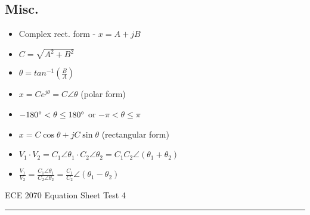 \documentclass [12pt] {article}
\begin{document}
\begin{multicols*}{2}
\section{Misc.}
	\begin{itemize}
		\item Complex rect. form - $x = A + jB$ 
		\item $C = \sqrt{A^2 + B^2}$ 
		\item $\theta = tan^{-1}(\frac{B}{A})$ 
		\item $x = Ce^{j\theta} = C \angle \theta $ (polar form) 
		\item $-180\degree < \theta \leq 180\degree $ or $ -\pi < \theta \leq \pi$ 
		\item $x = C\cos\theta + jC\sin\theta$ (rectangular form) 
		\item $V_1 \cdot V_2 = C_1\angle\theta_1 \cdot C_2\angle\theta_2 = C_1C_2\angle(\theta_1+\theta_2)$ 
		\item $\frac{V_1}{V_2} = \frac{C_1\angle\theta_1}{C_2\angle\theta_2} = \frac{C_1}{C_2}\angle(\theta_1 - \theta_2)$ 
	\end{itemize}
\end{multicols*}
\newpage
ECE 2070 Equation Sheet \hfill Test 4 \\
\rule{7.6in}{0.4pt}
\end{document}
